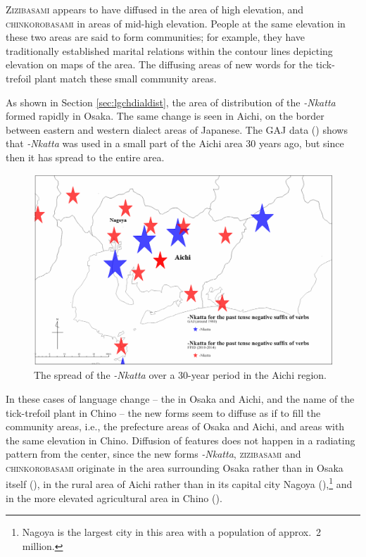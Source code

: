 \documentclass[output=paper]{LSP/langsci}
\begin{document}
\textsc{Zizibasami} appears to have diffused in the area of high elevation, and \textsc{chinkorobasami} in areas of mid-high elevation. People at the same elevation in these two areas are said to form communities; for example, they have traditionally established marital relations within the contour lines depicting elevation on maps of the area. The diffusing areas of new words for the tick-trefoil plant match these small community areas.

As shown in Section \ref{sec:lgchdialdist}, the area of distribution of the  \textit{-Nkatta} formed rapidly in Osaka. The same change is seen in Aichi, on the border between eastern and western dialect areas of Japanese. The GAJ data () shows that \textit{-Nkatta} was used in a small part of the Aichi area 30 years ago, but since then it has spread to the entire area.

\begin{figure}
\includegraphics[height=.4\textheight]{illustrations/onishi_fig6}
\caption{The spread of the  \textit{-Nkatta} over a 30-year period in the Aichi region.}
\label{fig:onishi:6}
\end{figure}
In these cases of language change -- the  in Osaka and Aichi, and the name of the tick-trefoil plant in Chino -- the new forms seem to diffuse as if to fill the community areas, i.e., the prefecture areas of Osaka and Aichi, and areas with the same elevation in Chino. Diffusion of features does not happen in a radiating pattern from the center, since the new forms \textit{-Nkatta}, \textsc{zizibasami} and \textsc{chinkorobasami} originate in the area surrounding Osaka rather than in Osaka itself (), in the rural area of Aichi rather than in its capital city Nagoya (),\footnote{ Nagoya is the largest city in this area with a population of approx.\ 2 million.} and in the more elevated agricultural area in Chino ().
\end{document}
